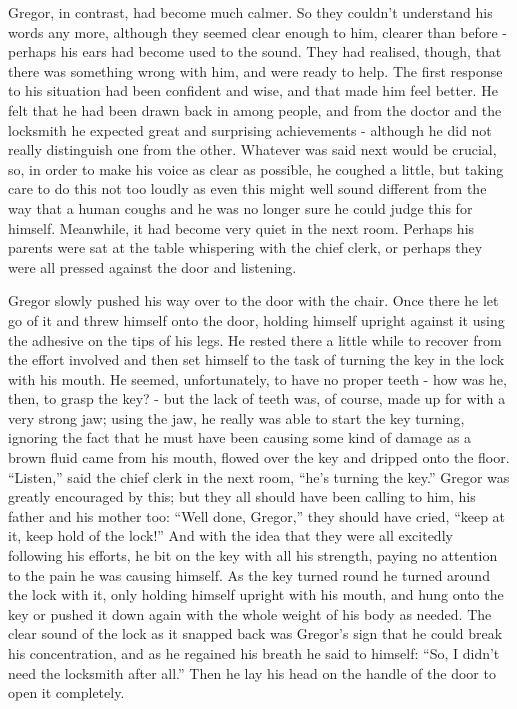 \documentclass[12pt]{report}
\begin{document}
Gregor, in contrast, had become much calmer. So they couldn't understand
his words any more, although they seemed clear enough to him, clearer
than before - perhaps his ears had become used to the sound. They had
realised, though, that there was something wrong with him, and were
ready to help. The first response to his situation had been confident
and wise, and that made him feel better. He felt that he had been drawn
back in among people, and from the doctor and the locksmith he expected
great and surprising achievements - although he did not really
distinguish one from the other. Whatever was said next would be crucial,
so, in order to make his voice as clear as possible, he coughed a
little, but taking care to do this not too loudly as even this might
well sound different from the way that a human coughs and he was no
longer sure he could judge this for himself. Meanwhile, it had become
very quiet in the next room. Perhaps his parents were sat at the table
whispering with the chief clerk, or perhaps they were all pressed
against the door and listening.

Gregor slowly pushed his way over to the door with the chair. Once there
he let go of it and threw himself onto the door, holding himself upright
against it using the adhesive on the tips of his legs. He rested there a
little while to recover from the effort involved and then set himself to
the task of turning the key in the lock with his mouth. He seemed,
unfortunately, to have no proper teeth - how was he, then, to grasp the
key? - but the lack of teeth was, of course, made up for with a very
strong jaw; using the jaw, he really was able to start the key turning,
ignoring the fact that he must have been causing some kind of damage as
a brown fluid came from his mouth, flowed over the key and dripped onto
the floor. ``Listen,'' said the chief clerk in the next room, ``he's
turning the key.'' Gregor was greatly encouraged by this; but they all
should have been calling to him, his father and his mother too: ``Well
done, Gregor,'' they should have cried, ``keep at it, keep hold of the
lock!'' And with the idea that they were all excitedly following his
efforts, he bit on the key with all his strength, paying no attention to
the pain he was causing himself. As the key turned round he turned
around the lock with it, only holding himself upright with his mouth,
and hung onto the key or pushed it down again with the whole weight of
his body as needed. The clear sound of the lock as it snapped back was
Gregor's sign that he could break his concentration, and as he regained
his breath he said to himself: ``So, I didn't need the locksmith after
all.'' Then he lay his head on the handle of the door to open it
completely.
\end{document}
